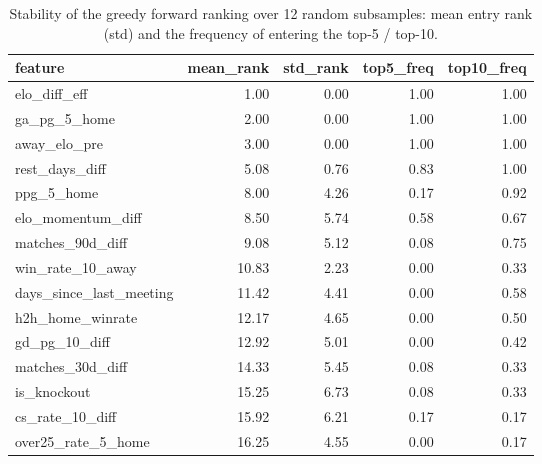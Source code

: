 \begin{table}[t]
  \centering
  \caption{Stability of the greedy forward ranking over 12 random subsamples: mean entry rank (\textpm std) and the frequency of entering the top-5 / top-10.}
  \label{tab:rev_fwd_stability}
  \begin{tabular}{lrrrr}
  \toprule
  feature & mean\_rank & std\_rank & top5\_freq & top10\_freq \\
  \midrule
  elo\_diff\_eff & 1.00 & 0.00 & 1.00 & 1.00 \\
  ga\_pg\_5\_home & 2.00 & 0.00 & 1.00 & 1.00 \\
  away\_elo\_pre & 3.00 & 0.00 & 1.00 & 1.00 \\
  rest\_days\_diff & 5.08 & 0.76 & 0.83 & 1.00 \\
  ppg\_5\_home & 8.00 & 4.26 & 0.17 & 0.92 \\
  elo\_momentum\_diff & 8.50 & 5.74 & 0.58 & 0.67 \\
  matches\_90d\_diff & 9.08 & 5.12 & 0.08 & 0.75 \\
  win\_rate\_10\_away & 10.83 & 2.23 & 0.00 & 0.33 \\
  days\_since\_last\_meeting & 11.42 & 4.41 & 0.00 & 0.58 \\
  h2h\_home\_winrate & 12.17 & 4.65 & 0.00 & 0.50 \\
  gd\_pg\_10\_diff & 12.92 & 5.01 & 0.00 & 0.42 \\
  matches\_30d\_diff & 14.33 & 5.45 & 0.08 & 0.33 \\
  is\_knockout & 15.25 & 6.73 & 0.08 & 0.33 \\
  cs\_rate\_10\_diff & 15.92 & 6.21 & 0.17 & 0.17 \\
  over25\_rate\_5\_home & 16.25 & 4.55 & 0.00 & 0.17 \\
  \bottomrule
  \end{tabular}
\end{table}
